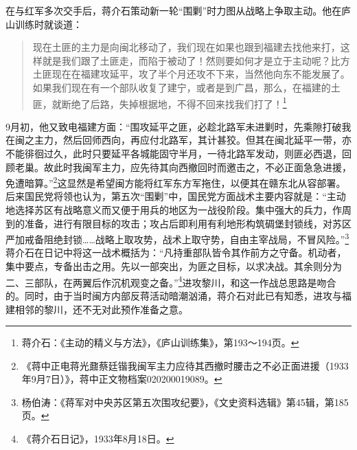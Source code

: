 在与红军多次交手后，蒋介石策动新一轮“围剿”时力图从战略上争取主动。他在庐山训练时就谈道：

\begin{quote}

现在土匪的主力是向闽北移动了，我们现在如果也跟到福建去找他来打，这样就是我们跟了土匪走，而陷于被动了！然则要如何才是立于主动呢？比方土匪现在在福建攻延平，攻了半个月还攻不下来，当然他向东不能发展了。如果我们现在有一个部队收复了建宁，或者是到广昌，那么，在福建的土匪，就断绝了后路，失掉根据地，不得不回来找我们打了！\footnote{蒋介石：《主动的精义与方法》，《庐山训练集》，第193～194页。}
\end{quote}


9月初，他又致电福建方面：“围攻延平之匪，必趁北路军未进剿时，先乘隙打破我在闽之主力，然后回师西向，再应付北路军，其计甚狡。但其在闽北延平一带，亦不能徘徊过久，此时只要延平各城能固守半月，一待北路军发动，则匪必西退，回顾老巢。故此时我闽军主力，应先待其向西撤回时而邀击之，不必正面急急进援，免遭暗算。”\footnote{《蒋中正电蒋光鼐蔡廷锴我闽军主力应待其西撤时腰击之不必正面进援（1933年9月7日）》，蒋中正文物档案020200019089。}这显然是希望闽方能将红军东方军拖住，以便其在赣东北从容部署。后来国民党将领也认为，第五次“围剿”中，国民党方面战术主要内容就是：“主动地选择苏区有战略意义而又便于用兵的地区为一战役阶段。集中强大的兵力，作周到的准备，进行有限目标的攻击；攻占后即利用有利地形构筑碉堡封锁线，对苏区严加戒备阻绝封锁……战略上取攻势，战术上取守势，自由主宰战局，不冒风险。”\footnote{杨伯涛：《蒋军对中央苏区第五次围攻纪要》，《文史资料选辑》第45辑，第185页。}蒋介石在日记中将这一战术概括为：“凡持重部队皆令其作前方之守备。机动者，集中要点，专备出击之用。先以一部突出，为匪之目标，以求决战。其余则分为二、三部队，在两翼后作沉机观变之备。”\footnote{《蒋介石日记》，1933年8月18日。}进攻黎川，和这一作战总思路是吻合的。同时，由于当时闽方内部反蒋活动暗潮汹涌，蒋介石对此已有知悉，进攻与福建相邻的黎川，还不无对此预作准备之意。


